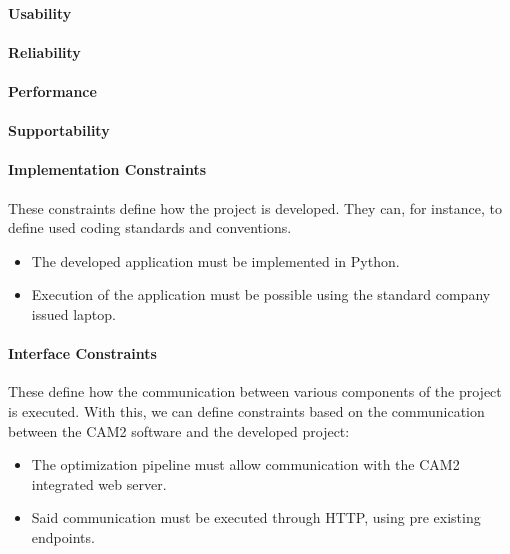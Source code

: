 \paragraph{Usability}

\paragraph{Reliability}

\paragraph{Performance}

\paragraph{Supportability}

\paragraph{Implementation Constraints} 

These constraints define how the project is developed. They can, for instance, to define used coding standards and conventions.

\begin{itemize}
	\item The developed application must be implemented in Python.
	\item Execution of the application must be possible using the standard company issued laptop.
\end{itemize}

\paragraph{Interface Constraints} 

These define how the communication between various components of the project is executed. With this, we can define constraints based on the communication between the CAM2\textsuperscript{\textregistered} software and the developed project:

\begin{itemize}
	\item The optimization pipeline must allow communication with the CAM2\textsuperscript{\textregistered} integrated web server.
	\item Said communication must be executed through HTTP, using pre existing endpoints.
\end{itemize}


